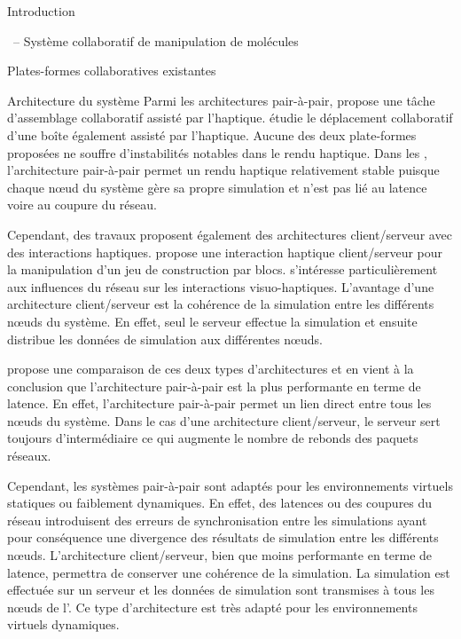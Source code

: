 \documentclass[myfrancais]{mythesis}
\begin{document}
\begin{mypart}{Introduction}
\begin{mychapter}{\myShaddock\ -- Système collaboratif de manipulation de molécules}
\begin{mysection}{Plates-formes collaboratives existantes}
\begin{mysubsection}{Architecture du système}
					Parmi les architectures pair-à-pair,  propose une tâche d'assemblage collaboratif assisté par l'haptique.
					 étudie le déplacement collaboratif d'une boîte également assisté par l'haptique.
					Aucune des deux plate-formes proposées ne souffre d'instabilités notables dans le rendu haptique.
					Dans les , l'architecture pair-à-pair permet un rendu haptique relativement stable puisque chaque nœud du système gère sa propre simulation et n'est pas lié au latence voire au coupure du réseau.
					
					Cependant, des travaux proposent également des architectures client/serveur avec des interactions haptiques.
					 propose une interaction haptique client/serveur pour la manipulation d'un jeu de construction par blocs.
					 s'intéresse particulièrement aux influences du réseau sur les interactions visuo-haptiques.
					L'avantage d'une architecture client/serveur est la cohérence de la simulation entre les différents nœuds du système.
					En effet, seul le serveur effectue la simulation et ensuite distribue les données de simulation aux différentes nœuds.

					 propose une comparaison de ces deux types d'architectures et en vient à la conclusion que l'architecture pair-à-pair est la plus performante en terme de latence.
					En effet, l'architecture pair-à-pair permet un lien direct entre tous les nœuds du système.
					Dans le cas d'une architecture client/serveur, le serveur sert toujours d'intermédiaire ce qui augmente le nombre de rebonds des paquets réseaux.

					Cependant, les systèmes pair-à-pair sont adaptés pour les environnements virtuels statiques ou faiblement dynamiques.
					En effet, des latences ou des coupures du réseau introduisent des erreurs de synchronisation entre les simulations ayant pour conséquence une divergence des résultats de simulation entre les différents nœuds.
					L'architecture client/serveur, bien que moins performante en terme de latence, permettra de conserver une cohérence de la simulation.
					La simulation est effectuée sur un serveur et les données de simulation sont transmises à tous les nœuds de l'.
					Ce type d'architecture est très adapté pour les environnements virtuels dynamiques.


\end{mysubsection}
\end{mysection}
\end{mychapter}
\end{mypart}
\end{document}
